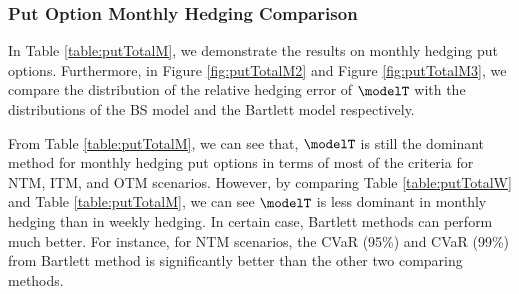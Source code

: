\newpage
\subsubsection{Put Option Monthly Hedging Comparison}
In Table \ref{table:putTotalM}, we demonstrate the results on monthly hedging put options. Furthermore, in Figure \ref{fig:putTotalM2} and  Figure \ref{fig:putTotalM3}, we compare the distribution of the relative hedging error of $\modelT$ with the distributions of the BS model and the Bartlett model respectively.

From Table \ref{table:putTotalM}, we can see that, $\modelT$ is still the dominant  method for monthly hedging put options in terms of most of the criteria for NTM, ITM, and OTM scenarios.  However, by comparing Table \ref{table:putTotalW} and Table \ref{table:putTotalM}, we can see $\modelT$ is less dominant in monthly hedging than in weekly hedging. In certain case, Bartlett methods can perform much better. For instance, for NTM scenarios, the CVaR (95\%) and CVaR (99\%) from Bartlett method is significantly better than the other two comparing methods. 
